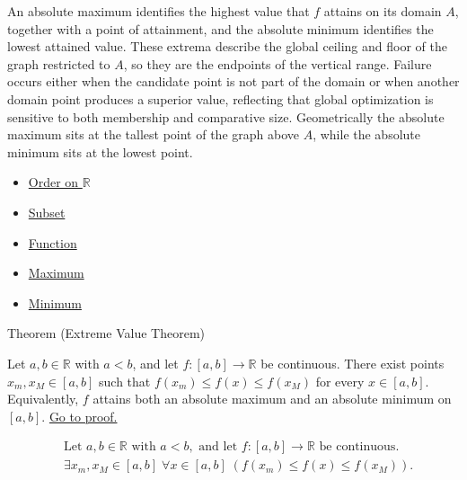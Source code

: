 \begin{remark*}[Interpretation]
An absolute maximum identifies the highest value that $f$ attains on its domain $A$, together with a point of attainment, and the absolute minimum identifies the lowest attained value. These extrema describe the global ceiling and floor of the graph restricted to $A$, so they are the endpoints of the vertical range. Failure occurs either when the candidate point is not part of the domain or when another domain point produces a superior value, reflecting that global optimization is sensitive to both membership and comparative size. Geometrically the absolute maximum sits at the tallest point of the graph above $A$, while the absolute minimum sits at the lowest point.
\end{remark*}

\begin{dependencies}
\begin{itemize}
  \item \hyperref[def:order-on-r]{Order on $\mathbb{R}$}
  \item \hyperref[def:subset]{Subset}
  \item \hyperref[def:function]{Function}
  \item \hyperref[def:maximum]{Maximum}
  \item \hyperref[def:minimum]{Minimum}
\end{itemize}
\end{dependencies}

\begin{theorembox}{Theorem (Extreme Value Theorem)}
\begin{theorem}
\label{thm:extreme-value-theorem}
Let $a,b \in \mathbb{R}$ with $a<b$, and let $f:[a,b] \to \mathbb{R}$ be continuous. There exist points $x_m,x_M \in [a,b]$ such that $f(x_m) \le f(x) \le f(x_M)$ for every $x \in [a,b]$. Equivalently, $f$ attains both an absolute maximum and an absolute minimum on $[a,b]$.
\hyperref[prf:extreme-value-theorem]{Go to proof.}
\end{theorem}
\end{theorembox}

\begin{remark*}
\[
\begin{aligned}
&\text{Let } a,b\in\mathbb{R} \text{ with } a<b, \text{ and let } f:[a,b]\to\mathbb{R} \text{ be continuous}.\\
&\exists x_m,x_M\in [a,b]\; \forall x\in [a,b]\; (f(x_m)\le f(x)\le f(x_M)).
\end{aligned}
\]
\end{remark*}

